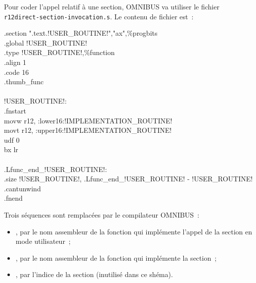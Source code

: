 Pour coder l'appel relatif à une section, OMNIBUS va utiliser le fichier \texttt{r12direct-section-invocation.s}. Le contenu de fichier est~:
\begin{SHELL}\small
\hspace*{1.2em}.section  ".text.!USER\_ROUTINE!","ax",\%progbits\\
\hspace*{1.2em}.global !USER\_ROUTINE!\\
\hspace*{1.2em}.type  !USER\_ROUTINE!,\%function\\
\hspace*{1.2em}.align  1\\
\hspace*{1.2em}.code  16\\
\hspace*{1.2em}.thumb\_func\\
\\
!USER\_ROUTINE!:\\
\hspace*{1.2em}.fnstart\\
\hspace*{1.2em}movw  r12, :lower16:!IMPLEMENTATION\_ROUTINE!\\
\hspace*{1.2em}movt  r12, :upper16:!IMPLEMENTATION\_ROUTINE!\\
\hspace*{1.2em}udf 0\\
\hspace*{1.2em}bx  lr\\
\\
.Lfunc\_end\_!USER\_ROUTINE!:\\
\hspace*{1.2em}.size  !USER\_ROUTINE!, .Lfunc\_end\_!USER\_ROUTINE! - !USER\_ROUTINE!\\
\hspace*{1.2em}.cantunwind\\
\hspace*{1.2em}.fnend
\end{SHELL}

Trois séquences sont remplacées par le compilateur OMNIBUS~:
\begin{itemize}
\item {}, par le nom assembleur de la fonction qui implémente l'appel de la section en mode utilisateur~;
\item {}, par le nom assembleur de la fonction qui implémente la section~;
\item {}, par l'indice de la section (inutilisé dans ce shéma).
\end{itemize}

